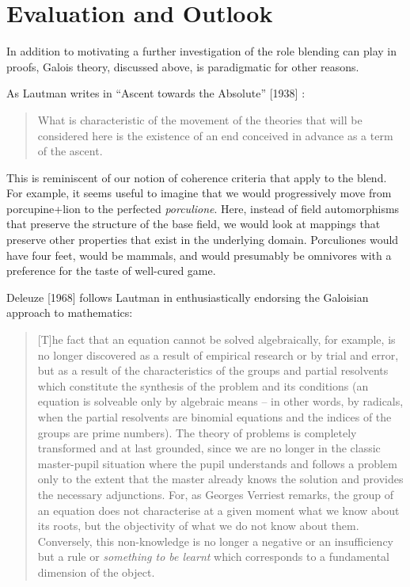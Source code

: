 \section{Evaluation and Outlook}
\label{sec:eval}

In addition to motivating a further investigation of the role blending
can play in proofs, Galois theory, discussed above, is paradigmatic
for other reasons.

As Lautman writes in ``Ascent towards the Absolute'' [1938] \cite[p. 126]{lautman2011mathematics}:
\begin{quote}
What is characteristic of the movement of the theories that will be
considered here is the existence of an end conceived in advance as a
term of the ascent.
\end{quote}

This is reminiscent of our notion of coherence criteria that apply to
the blend.  For example, it seems useful to imagine that we would
progressively move from porcupine+lion to the perfected
\emph{porculione}.  Here, instead of field automorphisms that preserve
the structure of the base field, we would look at mappings that
preserve other properties that exist in the underlying domain.
Porculiones would have four feet, would be mammals, and would
presumably be omnivores with a preference for the taste of well-cured
game.

Deleuze [1968] \cite[pp. 227--228]{deleuze1994difference} follows
Lautman in enthusiastically endorsing the Galoisian approach to
mathematics:
\begin{quote}
[T]he fact that an equation cannot be solved algebraically, for
example, is no longer discovered as a result of empirical research or
by trial and error, but as a result of the characteristics of the
groups and partial resolvents which constitute the synthesis of the
problem and its conditions (an equation is solveable only by algebraic
means -- in other words, by radicals, when the partial resolvents are
binomial equations and the indices of the groups are prime numbers).
The theory of problems is completely transformed and at last grounded,
since we are no longer in the classic master-pupil situation where the
pupil understands and follows a problem only to the extent that the
master already knows the solution and provides the necessary
adjunctions.  For, as Georges Verriest remarks, the group of an
equation does not characterise at a given moment what we know about
its roots, but the objectivity of what we do not know about them.
Conversely, this non-knowledge is no longer a negative or an
insufficiency but a rule or \emph{something to be learnt} which
corresponds to a fundamental dimension of the object.
\end{quote}

